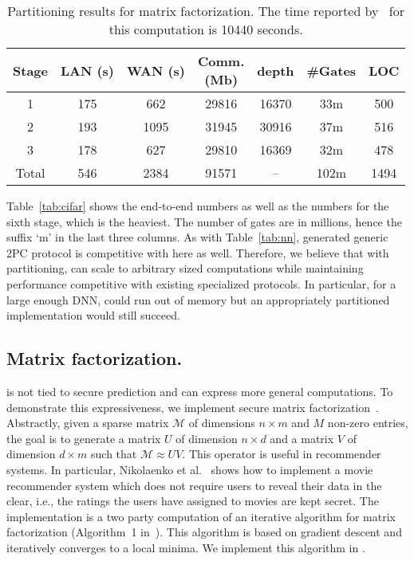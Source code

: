 \begin{table}[t]
\begin{tabular}{|c|c|c|c |c|c| c|}
\hline
  Stage         &  LAN (s) & WAN (s) & \thead{Comm. \\ (Mb)}  & depth & \#Gates & LOC\\
\hline
1    &  175       & 662        & 29816       & 16370    & 33m    & 500  \\
\hline
2    &  193        & 1095        & 31945        & 30916    & 37m & 516 \\
\hline
3    &  178        & 627        & 29810        & 16369    & 32m  & 478  \\
\hline
Total    &  546      & 2384        & 91571        & --    & 102m & 1494 \\
\hline
\end{tabular}

 \caption{Partitioning results for matrix factorization. The time reported by~\cite{valeriaMatrix} for this computation is 10440 seconds.}
 \label{tab:factor} 
\end{table}
Table~\ref{tab:cifar} shows the end-to-end numbers as
well as the numbers for the sixth stage, which is the heaviest. 
The number of gates are in millions, hence the suffix `m' in the last
three columns.
As with Table~\ref{tab:nn}, \tool generated generic 2PC protocol is
competitive with \minion here as well. Therefore,
we believe that with partitioning, \tool can scale to arbitrary sized
computations while maintaining performance
competitive with existing specialized protocols. In particular, for a
large enough DNN, \minion could run
out of memory but an appropriately partitioned \tool implementation would still
succeed.

\subsection{Matrix factorization.}
\tool is not tied to secure prediction and can express more general computations.
To demonstrate this expressiveness, we  implement secure matrix factorization~\cite{valeriaMatrix}. Abstractly, given a sparse matrix $\mathcal{M}$ of dimensions
$n\times m$ and $M$ non-zero entries, the goal is to generate a matrix $U$ of dimension $n\times d$ and a matrix
$V$ of dimension $d\times m$ such that $\mathcal{M}\approx UV$. This operator is useful in recommender systems.
In particular, Nikolaenko et al.~\cite{valeriaMatrix} shows how to implement a movie recommender system which does not require users to reveal their data in the clear, i.e., the ratings the users have assigned to movies are kept secret. The implementation is a two party computation of an iterative algorithm for matrix factorization (Algorithm~1 in~\cite{valeriaMatrix}).
This algorithm is based on gradient descent and iteratively converges to a local minima.
We implement this algorithm in \tool.
  
